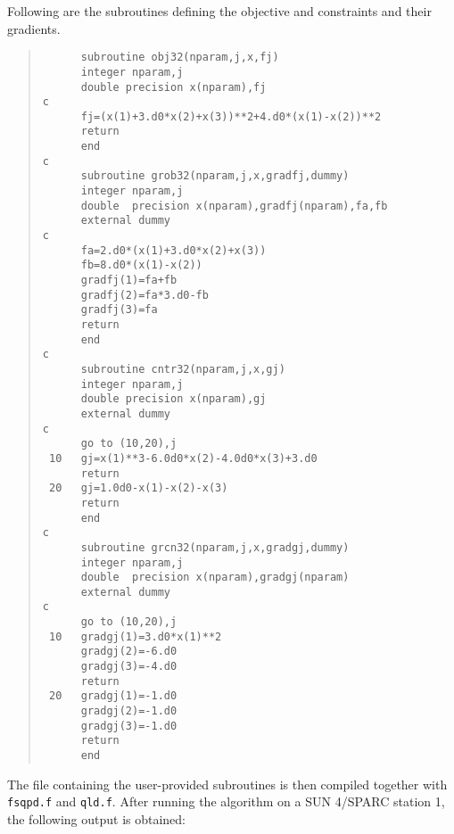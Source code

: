 Following are the subroutines defining the objective and 
constraints and their gradients.
\begin{quote}
\begin{verbatim}
      subroutine obj32(nparam,j,x,fj)
      integer nparam,j
      double precision x(nparam),fj
c
      fj=(x(1)+3.d0*x(2)+x(3))**2+4.d0*(x(1)-x(2))**2
      return
      end
c
      subroutine grob32(nparam,j,x,gradfj,dummy)
      integer nparam,j
      double  precision x(nparam),gradfj(nparam),fa,fb
      external dummy
c    
      fa=2.d0*(x(1)+3.d0*x(2)+x(3))
      fb=8.d0*(x(1)-x(2))
      gradfj(1)=fa+fb
      gradfj(2)=fa*3.d0-fb
      gradfj(3)=fa
      return
      end
c
      subroutine cntr32(nparam,j,x,gj)
      integer nparam,j
      double precision x(nparam),gj
      external dummy
c
      go to (10,20),j
 10   gj=x(1)**3-6.0d0*x(2)-4.0d0*x(3)+3.d0
      return
 20   gj=1.0d0-x(1)-x(2)-x(3)
      return
      end
c
      subroutine grcn32(nparam,j,x,gradgj,dummy)
      integer nparam,j
      double  precision x(nparam),gradgj(nparam)
      external dummy
c
      go to (10,20),j
 10   gradgj(1)=3.d0*x(1)**2
      gradgj(2)=-6.d0
      gradgj(3)=-4.d0
      return
 20   gradgj(1)=-1.d0
      gradgj(2)=-1.d0
      gradgj(3)=-1.d0
      return
      end
\end{verbatim}
\end{quote}
The file containing the user-provided subroutines is 
then compiled together with {\tt fsqpd.f} and {\tt qld.f}.
After running the algorithm on a SUN 4/SPARC station 1, the 
following output is obtained:
